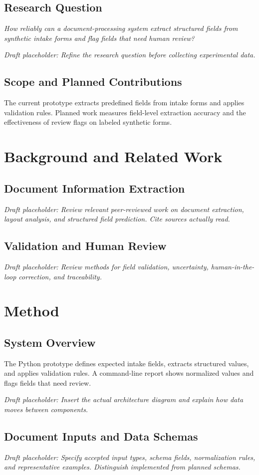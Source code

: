 \documentclass[11pt,letterpaper]{report}
\newcommand{\todowrite}[1]{\par\noindent\textit{Draft placeholder: #1}\par}
\begin{document}
\section{Research Question}
\emph{How reliably can a document-processing system extract structured fields
from synthetic intake forms and flag fields that need human review?}
\todowrite{Refine the research question before collecting experimental data.}

\section{Scope and Planned Contributions}
The current prototype extracts predefined fields from intake forms and applies
validation rules. Planned work measures field-level extraction accuracy and
the effectiveness of review flags on labeled synthetic forms.

\chapter{Background and Related Work}
\section{Document Information Extraction}
\todowrite{Review relevant peer-reviewed work on document extraction, layout analysis, and structured field prediction. Cite sources actually read.}

\section{Validation and Human Review}
\todowrite{Review methods for field validation, uncertainty, human-in-the-loop correction, and traceability.}

\chapter{Method}
\section{System Overview}
The Python prototype defines expected intake fields, extracts structured
values, and applies validation rules. A command-line report shows normalized
values and flags fields that need review.
\todowrite{Insert the actual architecture diagram and explain how data moves between components.}

\section{Document Inputs and Data Schemas}
\todowrite{Specify accepted input types, schema fields, normalization rules, and representative examples. Distinguish implemented from planned schemas.}
\end{document}
